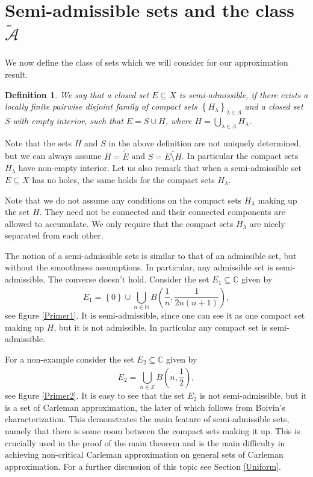 \documentclass[a4paper,11pt]{amsart}
\newcommand{\N}{\mathbb N}
\newcommand{\Z}{\mathbb Z}
\newcommand{\C}{\mathbb C}
\newcommand{\set}[1]{\left\{#1\right\}}
\newtheorem{definition}{Definition}
\begin{document}
\section{Semi-admissible sets and the class \texorpdfstring{$\widetilde{\mathcal{A}}$}{~A}} \label{terminology}

We now define the class of sets which we will consider for our approximation result.

\begin{definition}\label{semi-admissible}
    We say that a closed set $E \subseteq X$ is \emph{semi-admissible}, 
    if there exists a locally finite pairwise disjoint family of compact sets $\set{H_\lambda}_{\lambda \in \Lambda}$
    and a closed set $S$ with empty interior, such that $E = S \cup H$, where $H = \bigcup_{\lambda \in \Lambda} H_\lambda$.
\end{definition}
Note that the sets $H$ and $S$ in the above definition are not uniquely determined, but we can always assume $H = \overline{\mathring{E}}$ and $S = \overline{E \setminus H}$. 
In particular the compact sets $H_\lambda$ have non-empty interior.
Let us also remark that when a semi-admissible set $E \subseteq X$ has no holes, the same holds for the compact sets $H_\lambda$.

Note that we do not assume any conditions on the compact sets $H_\lambda$ making up the set $H$.
They need not be connected and their connected components are allowed to accumulate. 
We only require that the compact sets $H_\lambda$ are nicely separated from each other.

The notion of a semi-admissible sets is similar to that of an admissible set, but without the smoothness assumptions.
In particular, any admissible set is semi-admissible. The converse doesn't hold. 
Consider the set $E_1 \subseteq \C$ given by 
\[E_1 = \set{0} \cup \bigcup_{n \in \N} \overline{B\left(\frac{1}{n}, \frac{1}{2n(n+1)}\right)},\]
see figure \ref{Primer1}.
It is semi-admissible, since one can see it as one compact set making up $H$, but it is not admissible.
In particular any compact set is semi-admissible.

For a non-example consider the set $E_2 \subseteq \C$ given by 
\[E_2 = \bigcup_{n \in \Z} \overline{B\left(n, \frac{1}{2}\right)},\]
see figure \ref{Primer2}. 
It is easy to see that the set $E_2$ is not semi-admissible, 
but it is a set of Carleman approximation, the later of which follows from Boivin's characterization.
This demonstrates the main feature of semi-admissible sets, namely that there is some room between the compact sets making it up.
This is crucially used in the proof of the main theorem and is the main difficulty in achieving non-critical Carleman approximation on general sets of Carleman approximation. 
For a further discussion of this topic see Section \ref{Uniform}.  
\end{document}
